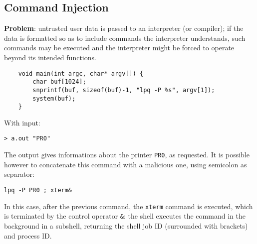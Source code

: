 \documentclass[a4paper, 10pt, titlepage]{article}
\begin{document}
\newpage
\subsection{Command Injection}
\textbf{Problem}: untrusted user data is passed to an interpreter (or compiler); if the data is formatted so as to include commands the interpreter understands, such commands may be executed and the interpreter might be forced to operate beyond its intended functions.
\begin{lstlisting}
	void main(int argc, char* argv[]) {
		char buf[1024];
		snprintf(buf, sizeof(buf)-1, "lpq -P %s", argv[1]);
		system(buf);
	}
\end{lstlisting}
With input:
\begin{verbatim}
> a.out "PR0"
\end{verbatim}
The output gives informations about the printer \lstinline|PR0|, as requested.
It is possible however to concatenate this command with a malicious one, using semicolon as separator:
\begin{verbatim}
lpq -P PR0 ; xterm&
\end{verbatim}
In this case, after the previous command, the \lstinline|xterm| command is executed, which is terminated by the control operator \lstinline|&|: the shell executes the command in the background in a subshell, returning the shell job ID (surrounded with brackets) and process ID.
\end{document}
